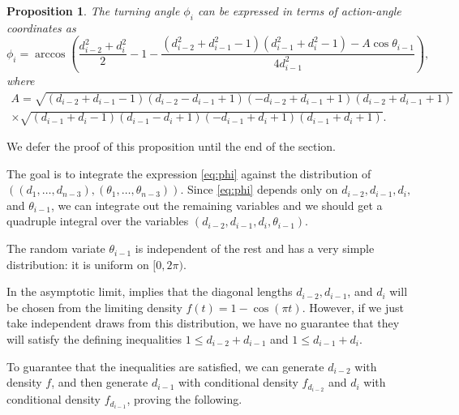 \documentclass{article}
\newtheorem{proposition}[theorem]{Proposition}
\theoremstyle{definition}
\begin{document}
	\begin{proposition}\label{prop:phi}
		The turning angle $\phi_i$ can be expressed in terms of action-angle coordinates as
		\begin{equation}\label{eq:phi}
			\phi_i = \arccos\left(\frac{d_{i-2}^2+d_i^2}{2} - 1 - \frac{(d_{i-2}^2 + d_{i-1}^2 - 1)(d_{i-1}^2 + d_{i}^2 - 1) - A \cos \theta_{i-1}}{4 d_{i-1}^2}\right),
		\end{equation}
		where 
		\begin{multline*}
			A = \sqrt{(d_{i-2}+d_{i-1}-1)(d_{i-2}-d_{i-1}+1)(-d_{i-2}+d_{i-1}+1)(d_{i-2}+d_{i-1}+1)}  \\
			\times \sqrt{(d_{i-1}+d_{i}-1)(d_{i-1}-d_{i}+1)(-d_{i-1}+d_{i}+1)(d_{i-1}+d_{i}+1)}.
		\end{multline*}
	\end{proposition}
	
	We defer the proof of this proposition until the end of the section.	


	
	The goal is to integrate the expression \eqref{eq:phi} against the distribution of $((d_1, \dots , d_{n-3}),(\theta_1, \dots , \theta_{n-3}))$. Since \eqref{eq:phi} depends only on $d_{i-2},d_{i-1},d_i,$ and $\theta_{i-1}$, we can integrate out the remaining variables and we should get a quadruple integral over the variables $(d_{i-2},d_{i-1},d_i,\theta_{i-1})$. 
	
	The random variate $\theta_{i-1}$ is independent of the rest and has a very simple distribution: it is uniform on $[0,2\pi)$.
	
	
	In the asymptotic limit,  implies that the diagonal lengths $d_{i-2}, d_{i-1}$, and $d_i$ will be chosen from the limiting density $f(t) = 1- \cos(\pi t)$. However, if we just take independent draws from this distribution, we have no guarantee that they will satisfy the defining inequalities $1 \leq d_{i-2} + d_{i-1}$ and $1 \leq d_{i-1} + d_i$.
	
	To guarantee that the inequalities are satisfied, we can generate $d_{i-2}$ with density $f$, and then generate $d_{i-1}$ with conditional density $f_{d_{i-2}}$ and $d_i$ with conditional density $f_{d_{i-1}}$, proving the following.
	
\end{document}
